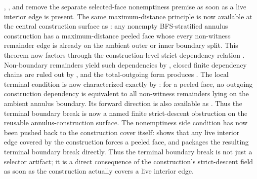 \documentclass[11pt]{article}
\begin{document}
,
,
and
remove the separate selected-face nonemptiness premise as soon as a live
interior edge is present.
The same maximum-distance principle is now available at the central construction
surface as
:
any nonempty BFS-stratified annulus construction has a maximum-distance peeled
face whose every non-witness remainder edge is already on the ambient outer or
inner boundary split.  This theorem now factors through the construction-level
strict dependency relation
.  Non-boundary
remainders yield such dependencies by
,
closed finite dependency chains are ruled out by
,
and the total-outgoing form
produces
.
The local terminal condition is now characterized exactly by
:
for a peeled face, no outgoing construction dependency is equivalent to all
non-witness remainders lying on the ambient annulus boundary.  Its forward
direction is also available as
.
Thus the terminal boundary break is now a named finite strict-descent
obstruction on the reusable annulus-construction surface.  The nonemptiness side
condition has now been pushed back
to the construction cover itself:
shows that any live interior edge covered by the construction forces a peeled
face, and
packages the resulting terminal boundary break directly.  Thus the terminal
boundary break is not just a selector artifact; it is a direct consequence of
the construction's strict-descent  field as soon as the construction
actually covers a live interior edge.
\end{document}
